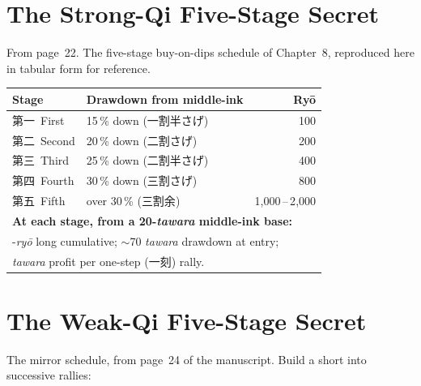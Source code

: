 \documentclass[10pt, openany]{book}
\newcommand{\jp}[1]{{\japanesefont #1}}
\begin{document}
\section{The Strong-Qi Five-Stage Secret}

From page~22. The five-stage buy-on-dips schedule of Chapter~8,
reproduced here in tabular form for reference.

\begin{center}
\begin{tabular}{@{}l l r@{}}
\toprule
\textbf{Stage} & \textbf{Drawdown from middle-ink} & \textbf{Ry\=o}\\
\midrule
\jp{第一}\ First   & 15\,\% down  (\jp{一割半さげ})   & 100\\
\jp{第二}\ Second  & 20\,\% down  (\jp{二割さげ})      & 200\\
\jp{第三}\ Third   & 25\,\% down  (\jp{二割半さげ})    & 400\\
\jp{第四}\ Fourth  & 30\,\% down  (\jp{三割さげ})      & 800\\
\jp{第五}\ Fifth   & over 30\,\%  (\jp{三割余})        & 1{,}000\,--\,2{,}000\\
\midrule
\multicolumn{3}{l}{\textbf{At each stage, from a 20-\textit{tawara} middle-ink base:}}\\
\multicolumn{3}{l}{\quad 800-\textit{ry\=o} long cumulative; ${\sim}$70 \textit{tawara} drawdown at entry;}\\
\multicolumn{3}{l}{\quad 160 \textit{tawara} profit per one-step (\jp{一刻}) rally.}\\
\bottomrule
\end{tabular}
\end{center}

\section{The Weak-Qi Five-Stage Secret}

The mirror schedule, from page~24 of the manuscript. Build a short
into successive rallies:
\end{document}
